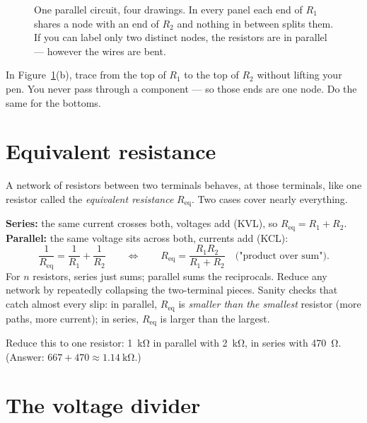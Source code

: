 \begin{figure}[htbp]
\centering

\caption{One parallel circuit, four drawings. In every panel each end of
$R_1$ shares a node with an end of $R_2$ and nothing in between splits them.
If you can label only two distinct nodes, the resistors are in parallel —
however the wires are bent.}
\label{fig:redraws}
\end{figure}

\begin{exercise}[easy]
In Figure~\ref{fig:redraws}(b), trace from the top of $R_1$ to the top of
$R_2$ without lifting your pen. You never pass through a component — so those
ends are one node. Do the same for the bottoms.
\end{exercise}

\section{Equivalent resistance}
\label{sec:req}

A network of resistors between two terminals behaves, at those terminals, like
one resistor called the \emph{equivalent resistance} $R_{\mathrm{eq}}$. Two cases cover nearly everything.

\textbf{Series:} the same current crosses both, voltages add (KVL), so
$R_{\mathrm{eq}} = R_1 + R_2$. \textbf{Parallel:} the same voltage sits across
both, currents add (KCL):
\[
\frac{1}{R_{\mathrm{eq}}} = \frac{1}{R_1} + \frac{1}{R_2}
\qquad\Longleftrightarrow\qquad
R_{\mathrm{eq}} = \frac{R_1 R_2}{R_1 + R_2}\quad\text{("product over sum")}.
\]
For $n$ resistors, series just sums; parallel sums the reciprocals. Reduce
any network by repeatedly collapsing the two-terminal pieces. Sanity checks
that catch almost every slip: in parallel, $R_{\mathrm{eq}}$ is
\emph{smaller than the smallest} resistor (more paths, more current); in
series, $R_{\mathrm{eq}}$ is larger than the largest.

\begin{exercise}[easy]
Reduce this to one resistor: \qty{1}{\kilo\ohm} in parallel with
\qty{2}{\kilo\ohm}, in series with \qty{470}{\ohm}. (Answer:
$667 + 470 \approx \qty{1.14}{\kilo\ohm}$.)
\end{exercise}

\section{The voltage divider}
\label{sec:divider}

